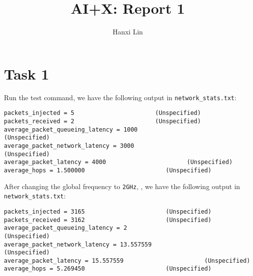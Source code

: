\documentclass{article}
\title{\bf\huge AI+X: Report 1}
\author{Hanxi Lin}
\begin{document}
\maketitle

\section*{Task 1}
Run the test command, we have the following output in \verb`network_stats.txt`:
\begin{lstlisting}[language={}]  
packets_injected = 5                       (Unspecified)
packets_received = 2                       (Unspecified)
average_packet_queueing_latency = 1000                       (Unspecified)
average_packet_network_latency = 3000                       (Unspecified)
average_packet_latency = 4000                       (Unspecified)
average_hops = 1.500000                       (Unspecified)
\end{lstlisting}
After changing the global frequency to \verb|2GHz|, , we have the following output in \verb`network_stats.txt`:
\begin{lstlisting}[language={}]
packets_injected = 3165                       (Unspecified)
packets_received = 3162                       (Unspecified)
average_packet_queueing_latency = 2                       (Unspecified)
average_packet_network_latency = 13.557559                       (Unspecified)
average_packet_latency = 15.557559                       (Unspecified)
average_hops = 5.269450                       (Unspecified)
\end{lstlisting}
\end{document}

